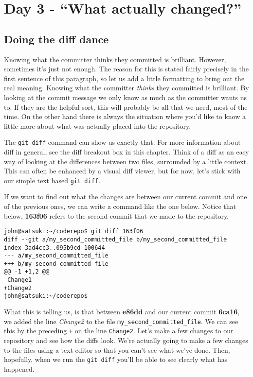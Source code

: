 \section{Day 3 - ``What actually changed?''}
\subsection{Doing the diff dance}

Knowing what the committer thinks they committed is brilliant.  However, sometimes it's just not enough.  The reason for this is stated fairly precisely in the first sentence of this paragraph, so let us add a little formatting to bring out the real meaning.  Knowing what the committer \emph{thinks} they committed is brilliant.  By looking at the commit message we only know as much as the committer wants us to.  If they are the helpful sort, this will probably be all that we need, most of the time.  On the other hand there is always the situation where you'd like to know a little more about what was actually placed into the repository.

The \texttt{git diff} command can show us exactly that.  For more information about diff in general, see the diff breakout box in this chapter.  Think of a diff as an easy way of looking at the differences between two files, surrounded by a little context.  This can often be enhanced by a visual diff viewer, but for now, let's stick with our simple text based \texttt{git diff}.  

If we want to find out what the changes are between our current commit and one of the previous ones, we can write a command like the one below.  Notice that below, \textbf{163f06} refers to the second commit that we made to the repository.  

\begin{Verbatim}
john@satsuki:~/coderepo$ git diff 163f06
diff --git a/my_second_committed_file b/my_second_committed_file
index 3ad4cc3..095b9cd 100644
--- a/my_second_committed_file
+++ b/my_second_committed_file
@@ -1 +1,2 @@
 Change1
+Change2
john@satsuki:~/coderepo$ 
\end{Verbatim}

What this is telling us, is that between \textbf{e86dd} and our current commit \textbf{6ca16}, we added the line \emph{Change2} to the file \texttt{my\_second\_committed\_file}.  We can see this by the preceding \texttt{+} on the line \texttt{Change2}.  Let's make a few changes to our repository and see how the diffs look.  We're actually going to make a few changes to the files using a text editor so that you can't see what we've done.  Then, hopefully, when we run the \texttt{git diff} you'll be able to see clearly what has happened.

